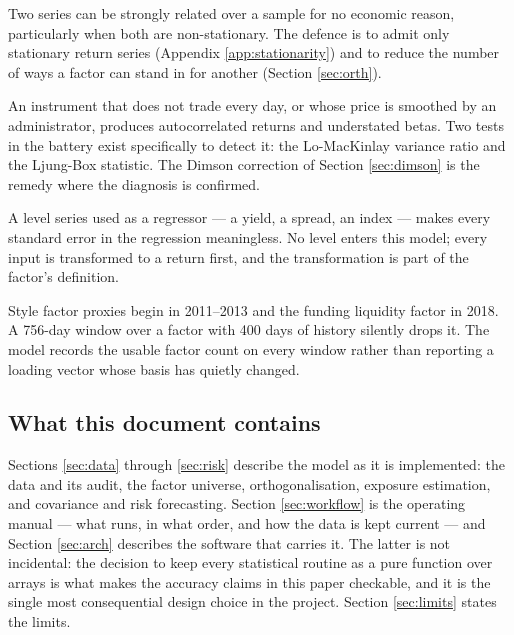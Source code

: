 \documentclass[11pt,a4paper]{article}
\begin{document}
\begin{description}[leftmargin=1.6em,style=nextline,itemsep=0.4ex]
\item[Spurious correlation.] Two series can be strongly related over a sample for no
  economic reason, particularly when both are non-stationary. The defence is to admit
  only stationary return series (Appendix \ref{app:stationarity}) and to reduce the
  number of ways a factor can stand in for another (Section \ref{sec:orth}).
\item[Stale pricing.] An instrument that does not trade every day, or whose price is
  smoothed by an administrator, produces autocorrelated returns and understated
  betas. Two tests in the battery exist specifically to detect it: the Lo-MacKinlay
  variance ratio and the Ljung-Box statistic. The Dimson correction of Section
  \ref{sec:dimson} is the remedy where the diagnosis is confirmed.
\item[Non-stationarity.] A level series used as a regressor --- a yield, a spread, an
  index --- makes every standard error in the regression meaningless. No level enters
  this model; every input is transformed to a return first, and the transformation is
  part of the factor's definition.
\item[Short histories.] Style factor proxies begin in 2011--2013 and the funding
  liquidity factor in 2018. A 756-day window over a factor with 400 days of history
  silently drops it. The model records the usable factor count on every window rather
  than reporting a loading vector whose basis has quietly changed.
\end{description}

\subsection{What this document contains}

Sections \ref{sec:data} through \ref{sec:risk} describe the model as it is
implemented: the data and its audit, the factor universe, orthogonalisation, exposure
estimation, and covariance and risk forecasting. Section \ref{sec:workflow} is the
operating manual --- what runs, in what order, and how the data is kept current ---
and Section \ref{sec:arch} describes the software that carries it. The latter is not
incidental: the decision to keep every statistical routine as a pure function over
arrays is what makes the accuracy claims in this paper checkable, and it is the
single most consequential design choice in the project. Section \ref{sec:limits}
states the limits.
\end{document}
